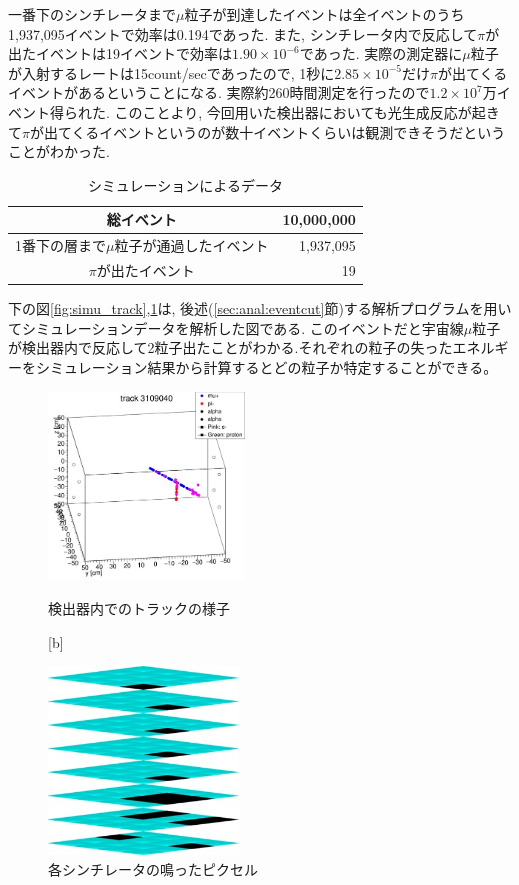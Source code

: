 一番下のシンチレータまで$\mu$粒子が到達したイベントは全イベントのうち1,937,095イベントで効率は0.194であった.
また, シンチレータ内で反応して$\pi$が出たイベントは19イベントで効率は$1.90 \times10^{-6}$であった.
実際の測定器に$\mu$粒子が入射するレートは15count/secであったので, 1秒に$2.85 \times10^{-5}$だけ$\pi$が出てくるイベントがあるということになる.
実際約260時間測定を行ったので$1.2 \times10^{7}$万イベント得られた.
このことより, 今回用いた検出器においても光生成反応が起きて$\pi$が出てくるイベントというのが数十イベントくらいは観測できそうだということがわかった.

\begin{table}[H]
    \centering
    \caption{シミュレーションによるデータ}
    \label{tab:simu_data}
    \begin{tabular}{|c|r|}
        \hline
        総イベント                               & 10,000,000 \\ \hline
        1番下の層まで$\mu$粒子が通過したイベント & 1,937,095  \\ \hline
        $\pi$が出たイベント                      & 19         \\ \hline
    \end{tabular}
\end{table}

下の図\ref{fig:simu_track},\ref{fig:simu_pixel}は, 後述(\ref{sec:anal:eventcut}節)する解析プログラムを用いてシミュレーションデータを解析した図である.
このイベントだと宇宙線$\mu$粒子が検出器内で反応して2粒子出たことがわかる.それぞれの粒子の失ったエネルギーをシミュレーション結果から計算するとどの粒子か特定することができる。
\begin{figure}[H]
    \begin{minipage}[b]{0.47\linewidth}
        \centering
        \includegraphics[height=5cm]{img/track_pion.jpg}
        \caption{検出器内でのトラックの様子}
        \label{fig:simu_track}
    \end{minipage}[b]
    \begin{minipage}[b]{0.47\linewidth}
        \centering
        \includegraphics[height=5cm]{img/track_simulation.jpg}
        \caption{各シンチレータの鳴ったピクセル}
        \label{fig:simu_pixel}
    \end{minipage}
\end{figure}


